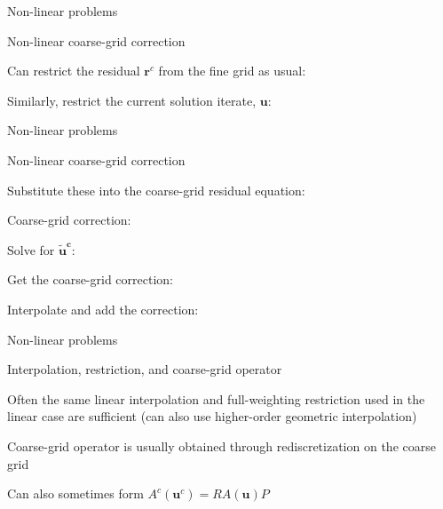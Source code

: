 \documentclass[18pt,xcolor=table]{beamer}
\begin{document}
\begin{frame}{Non-linear problems}
\begin{block}{Non-linear coarse-grid correction}
\bit
\item Can restrict the residual $\mathbf{r}^c$ from the fine grid as usual:
\item Similarly, restrict the current solution iterate, $\mathbf{u}$:
\eit
\end{block}
\end{frame}


\begin{frame}{Non-linear problems}
\begin{block}{Non-linear coarse-grid correction}
\bit
\item Substitute these into the coarse-grid residual equation:
\item Coarse-grid correction:
\bit
\item Solve for $\mathbf{\tilde{u}^c}$: 
\item Get the coarse-grid correction:
\item Interpolate and add the correction:
\eit
\eit
\end{block}
\end{frame}

\begin{frame}{Non-linear problems}
\begin{block}{Interpolation, restriction, and coarse-grid operator}
\bit
\item Often the same linear interpolation and full-weighting restriction used in the linear case are sufficient (can also use higher-order geometric interpolation)
\item Coarse-grid operator is usually obtained through rediscretization on the coarse grid
\item Can also sometimes form $A^c(\mathbf{u}^c) = RA(\mathbf{u})P$
\eit 
\end{block}
\end{frame}
\end{document}
